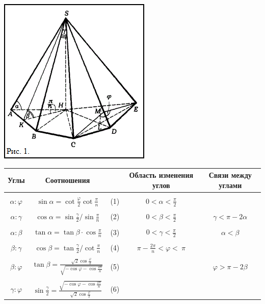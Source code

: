 \documentclass[12pt,a4paper,twocolumn,twoside]{article}
\begin{document}
\leftskip=0cm
\noindent\includegraphics{fig1}\\

\begin{tabular}{ c | c r| c | c }
\hline
Углы & \hspace*{0.7cm} Соотношения&& Область изменения углов & Связи между углами\\
\hline
&&&\\
$\alpha: \varphi$ & $\displaystyle \sin \alpha = \cot \frac{\varphi}{2} \cot \frac{\pi}{n}$ & (1)& $\displaystyle 0 < \alpha < \frac{\pi}{2}$ & \\
&&&\\
$\alpha: \gamma$ & $\displaystyle \cos \alpha = \sin \frac{\gamma}{2}/\sin \frac{\pi}{n}$ & (2)& $\displaystyle 0 < \beta < \frac{\pi}{2}$ & $\displaystyle \gamma < \pi - 2\alpha$ \\
&&&\\
$\alpha: \beta$ & $\displaystyle \tan \alpha = \tan \beta \cdot \cos \frac{\pi}{n}$ & (3)& $\displaystyle 0 < \gamma < \frac{\pi}{2}$ & $\displaystyle \alpha< \beta$ \\
&&&\\
$\beta: \gamma$ & $\displaystyle \cos \beta = \tan \frac{\gamma}{2}/\cot\frac{\pi}{n}$ & (4)& $\displaystyle \pi - \frac{2\pi}{n} < \varphi < \ \pi$ & \\
&&&\\
$\beta: \varphi$ & $\displaystyle \tan \beta = \frac {\sqrt{2} \cos \frac{\varphi}{2} } {\sqrt{-\cos \varphi - \cos \frac{2\pi}{n} } }$ & (5)& & $\displaystyle \varphi > \pi - 2\beta$ \\
&&&\\
$\gamma: \varphi$ & $\displaystyle \sin \frac{\gamma}{2} = \frac {\sqrt{-\cos \varphi - \cos \frac{2\pi}{n}}} {\sqrt{2} \cos \frac{\varphi}{2}}$ & (6)& & \\
\end{tabular}
\end{document}
